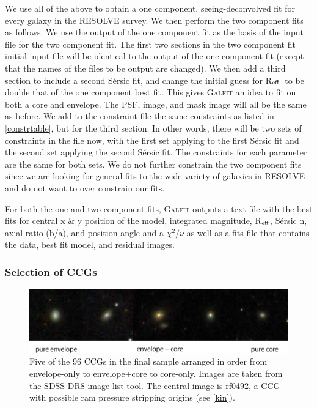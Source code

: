 \documentclass[iop,apj]{emulateapj}
\newcommand{\Reff}{R$_{\rm eff}$}
\begin{document}
\noindent We use all of the above to obtain a one component, seeing-deconvolved fit for every galaxy in the RESOLVE survey. We then perform the two component fits as follows. We use the output of the one component fit as the basis of the input file for the two component fit. The first two sections in the two component fit initial input file will be identical to the output of the one component fit (except that the names of the files to be output are changed). We then add a third section to include a second S\'ersic fit, and change the initial guess for \Reff\ to be double that of the one component best fit. This gives \textsc{Galfit} an idea to fit on both a core and envelope. The PSF, image, and mask image will all be the same as before. We add to the constraint file the same constraints as listed in \autoref{constrtable}, but for the third section. In other words, there will be two sets of constraints in the file now, with the first set applying to the first S\'ersic fit and the second set applying the second S\'ersic fit. The constraints for each parameter are the same for both sets. We do not further constrain the two component fits since we are looking for general fits to the wide variety of galaxies in RESOLVE and do not want to over constrain our fits.

For both the one and two component fits, \textsc{Galfit} outputs a text file with the best fits for central x \& y position of the model, integrated magnitude, \Reff, S\'ersic n, axial ratio (b/a), and position angle and a $\chi^2/\nu$ as well as a fits file that contains the data, best fit model, and residual images.

\subsubsection{Selection of CCGs}
\label{CCGs}

\begin{figure}[t]
\begin{center}
\includegraphics{CCGpics.eps}
\caption{Five of the 96 CCGs in the final sample arranged in order from envelope-only to envelope+core to core-only. Images are taken from the SDSS-DR8 image list tool. The central image is rf0492, a CCG with possible ram pressure stripping origins (see \autoref{kin}).}
\label{fig:pics}
\end{center}
\end{figure}
\end{document}
